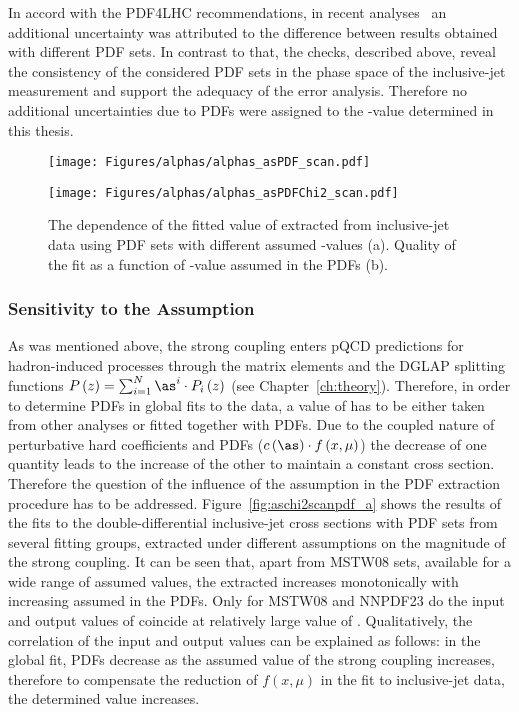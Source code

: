 In accord with the PDF4LHC recommendations, in recent analyses~\cite{thesis:britzger:2013} an additional uncertainty was attributed to the difference between results obtained with different PDF sets. In contrast to that, the checks, described above, reveal the consistency of the considered PDF sets in the phase space of the inclusive-jet measurement and support the adequacy of the  error analysis. Therefore no additional uncertainties due to PDFs were assigned to the \asz-value determined in this thesis. 
\begin{figure}[t]
 \centering
\begin{subfloat}[]{\texttt{[image: Figures/alphas/alphas\_asPDF\_scan.pdf]}
   \label{fig:aschi2scanpdf_a}
 }%
\end{subfloat}
\begin{subfloat}[]{\texttt{[image: Figures/alphas/alphas\_asPDFChi2\_scan.pdf]}
   \label{fig:aschi2scanpdf_b}
 }%
\end{subfloat}
 \caption{The dependence of the fitted value of \asz extracted from inclusive-jet data using PDF sets with different assumed \asz-values (a). Quality of the fit as a function of \asz-value assumed in the PDFs (b).}
 \label{fig:aschi2scanpdf}
\end{figure}
\subsubsection{Sensitivity to the \asz Assumption}
\label{subsec:asassump}
As was mentioned above, the strong coupling enters pQCD predictions for hadron-induced processes through the matrix elements and the DGLAP splitting functions $P\left(z\right)=\sum_{i=1}^{N}{\as^i\cdot P_i\left(z\right)}$ (see Chapter~\ref{ch:theory}). Therefore, in order to determine PDFs in global fits to the data, a value of \asz has to be either taken from other analyses or fitted together with PDFs. Due to the coupled nature of perturbative hard coefficients and PDFs ($c\left(\as\right)\cdot f\left(x,\mu\right)$) the decrease of one quantity leads to the increase of the other to maintain a constant cross section. Therefore the question of the influence of the \asz assumption in the PDF extraction procedure has to be addressed. Figure~\ref{fig:aschi2scanpdf_a} shows the results of the \asz fits to the double-differential inclusive-jet cross sections with PDF sets from several fitting groups, extracted under different assumptions on the magnitude of the strong coupling. It can be seen that, apart from MSTW08 sets, available for a wide range of assumed \asz values, the extracted \asz increases monotonically with increasing \asz assumed in the PDFs. Only for MSTW08 and NNPDF23 do the input and output values of \asz coincide at relatively large value of \as. Qualitatively, the correlation of the input and output values can be explained as follows: in the global fit, PDFs decrease as the assumed value of the strong coupling increases, therefore to compensate the reduction of $f\left(x,\mu\right)$ in the fit to inclusive-jet data, the determined \asz value increases.

